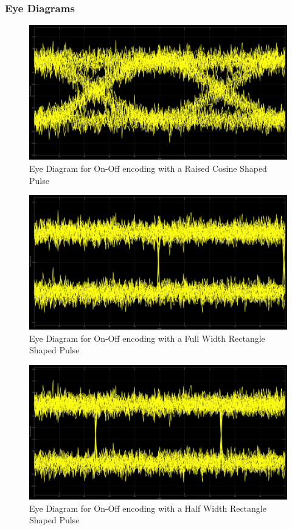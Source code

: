 \documentclass{article}
\begin{document}
\subsubsection{Eye Diagrams}
\begin{figure}[H]
  \includegraphics[width = \linewidth]{OO_Rasied_Eye.jpg}
  \caption{Eye Diagram for On-Off encoding with a Raised Cosine Shaped Pulse}
  \label{fig:OO-Raised-Eye}
\end{figure}
\begin{figure}[H]
  \includegraphics[width = \linewidth]{OO_Rect_F_Eye.jpg}
  \caption{Eye Diagram for On-Off encoding with a Full Width Rectangle Shaped Pulse}
  \label{fig:OO-Rect-F-Eye}
\end{figure}
\begin{figure}[H]
  \includegraphics[width = \linewidth]{OO_Rect_H_Eye.jpg}
  \caption{Eye Diagram for On-Off encoding with a Half Width Rectangle Shaped Pulse}
  \label{fig:OO-Rect-H-Eye}
\end{figure}
\end{document}
